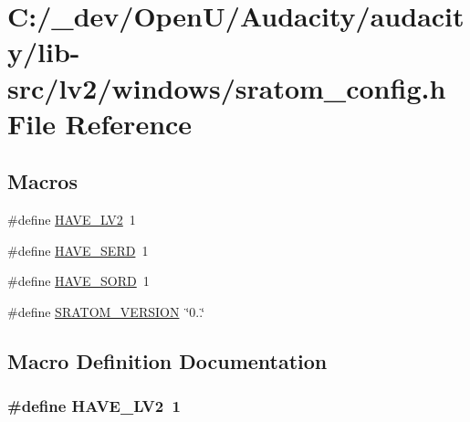 \hypertarget{lib-src_2lv2_2windows_2sratom__config_8h}{}\section{C\+:/\+\_\+dev/\+Open\+U/\+Audacity/audacity/lib-\/src/lv2/windows/sratom\+\_\+config.h File Reference}
\label{lib-src_2lv2_2windows_2sratom__config_8h}
\subsection*{Macros}
\begin{DoxyCompactItemize}
\item 
\#define \hyperlink{lib-src_2lv2_2windows_2sratom__config_8h_a3377686d402043f36819f446ef0e0edd}{H\+A\+V\+E\+\_\+\+L\+V2}~1
\item 
\#define \hyperlink{lib-src_2lv2_2windows_2sratom__config_8h_af73dc1c61a8c088c96f3a0f3a85b75dd}{H\+A\+V\+E\+\_\+\+S\+E\+RD}~1
\item 
\#define \hyperlink{lib-src_2lv2_2windows_2sratom__config_8h_a49c11735861a0675e6a29e557c574eab}{H\+A\+V\+E\+\_\+\+S\+O\+RD}~1
\item 
\#define \hyperlink{lib-src_2lv2_2windows_2sratom__config_8h_af4904d1a80a5b33aa0bc67148006cf3a}{S\+R\+A\+T\+O\+M\+\_\+\+V\+E\+R\+S\+I\+ON}~\char`\"{}0..\char`\"{}
\end{DoxyCompactItemize}


\subsection{Macro Definition Documentation}
\subsubsection[{\texorpdfstring{H\+A\+V\+E\+\_\+\+L\+V2}{HAVE_LV2}}]{\setlength{\rightskip}{0pt plus 5cm}\#define H\+A\+V\+E\+\_\+\+L\+V2~1}\hypertarget{lib-src_2lv2_2windows_2sratom__config_8h_a3377686d402043f36819f446ef0e0edd}{}\label{lib-src_2lv2_2windows_2sratom__config_8h_a3377686d402043f36819f446ef0e0edd}


